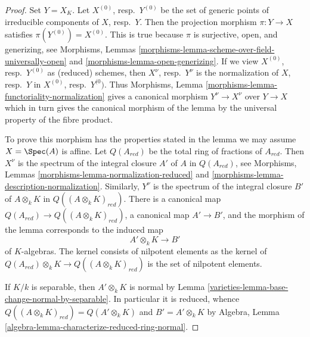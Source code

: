 \begin{proof}

Set $Y = X_K$. Let $X^{(0)}$, resp.\ $Y^{(0)}$ be the set of generic points
of irreducible components of $X$, resp.\ $Y$. Then the projection morphism
$\pi : Y \to X$ satisfies $\pi(Y^{(0)}) = X^{(0)}$. This is true because
$\pi$ is surjective, open, and generizing, see
Morphisms, Lemmas \ref{morphisms-lemma-scheme-over-field-universally-open} and
\ref{morphisms-lemma-open-generizing}.
If we view $X^{(0)}$, resp.\ $Y^{(0)}$ as (reduced) schemes, then
$X^\nu$, resp.\ $Y^\nu$ is the normalization of $X$, resp.\ $Y$ in
$X^{(0)}$, resp.\ $Y^{(0})$.
Thus Morphisms, Lemma \ref{morphisms-lemma-functoriality-normalization}
gives a canonical morphism $Y^\nu \to X^\nu$ over $Y \to X$ which in
turn gives the canonical morphism of the lemma by the universal
property of the fibre product.

\medskip\noindent
To prove this morphism has the properties stated in the lemma we may
assume $X = \Spec(A)$ is affine. Let $Q(A_{red})$ be the
total ring of fractions of $A_{red}$. Then $X^\nu$ is the spectrum of
the integral closure $A'$ of $A$ in $Q(A_{red})$, see
Morphisms, Lemmas \ref{morphisms-lemma-normalization-reduced} and
\ref{morphisms-lemma-description-normalization}.
Similarly, $Y^\nu$ is the spectrum of the integral closure $B'$ of
$A \otimes_k K$ in $Q((A \otimes_k K)_{red})$. There is a canonical
map $Q(A_{red}) \to Q((A \otimes_k K)_{red})$, a canonical map
$A' \to B'$, and the morphism of the lemma corresponds to the induced map
$$
A' \otimes_k K \longrightarrow B'
$$
of $K$-algebras. The kernel consists of nilpotent
elements as the kernel of $Q(A_{red}) \otimes_k K \to Q((A \otimes_k K)_{red})$
is the set of nilpotent elements.

\medskip\noindent
If $K/k$ is separable, then $A' \otimes_k K$ is normal by
Lemma \ref{varieties-lemma-base-change-normal-by-separable}. In particular
it is reduced, whence $Q((A \otimes_k K)_{red}) = Q(A' \otimes_k K)$
and $B' = A' \otimes_k K$ by
Algebra, Lemma \ref{algebra-lemma-characterize-reduced-ring-normal}.


\end{proof}
